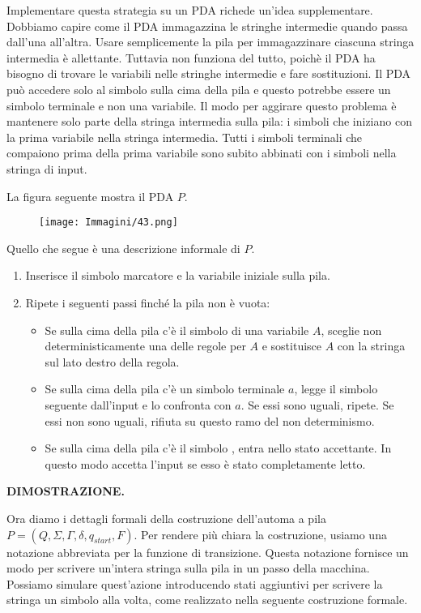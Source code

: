 \documentclass{article}
\begin{document}
Implementare questa strategia su un PDA richede un'idea supplementare.
Dobbiamo capire come il PDA immagazzina le stringhe intermedie quando passa dall'una all'altra. 
Usare semplicemente la pila per immagazzinare ciascuna stringa intermedia è allettante. 
Tuttavia non funziona del tutto, poichè il PDA ha bisogno di trovare le variabili nelle stringhe intermedie e fare sostituzioni. 
Il PDA può accedere solo al simbolo sulla cima della pila e questo potrebbe essere un simbolo terminale e non una variabile. 
Il modo per aggirare questo problema è mantenere solo parte della stringa intermedia sulla pila: i simboli che iniziano con la prima variabile nella stringa intermedia. 
Tutti i simboli terminali che compaiono prima della prima variabile sono subito abbinati con i simboli nella stringa di input.

La figura seguente mostra il PDA $P$.

\begin{figure}[H]
    \centering
    \texttt{[image: Immagini/43.png]}
    \label{fig:pda_example1}
\end{figure}

Quello che segue è una descrizione informale di $P$.
\begin{enumerate}
    \item Inserisce il simbolo marcatore \textdollar \text{ }e la variabile iniziale sulla pila.
    \item Ripete i seguenti passi finché la pila non è vuota:
    \begin{itemize}
        \item Se sulla cima della pila c'è il simbolo di una variabile $A$, sceglie non deterministicamente una delle regole per $A$ e sostituisce $A$ con la stringa sul lato destro della regola.
        \item Se sulla cima della pila c'è un simbolo terminale $a$, legge il simbolo seguente dall'input e lo confronta con $a$. Se essi sono uguali, ripete. Se essi non sono uguali, rifiuta su questo ramo del non determinismo.
        \item Se sulla cima della pila c'è il simbolo \textdollar \text{ }, entra nello stato accettante. In questo modo accetta l'input se esso è stato completamente letto.
    \end{itemize}
\end{enumerate}
\vspace{1em}
 
\textbf{DIMOSTRAZIONE.}

Ora diamo i dettagli formali della costruzione dell'automa a pila $P = (Q,\Sigma,\Gamma,\delta,q_{start},F)$. 
Per rendere più chiara la costruzione, usiamo una notazione abbreviata per la funzione di transizione.
Questa notazione fornisce un modo per scrivere un'intera stringa sulla pila in un passo della macchina. 
Possiamo simulare quest'azione introducendo stati aggiuntivi per scrivere la stringa un simbolo alla volta, come realizzato nella seguente costruzione formale.
\end{document}
